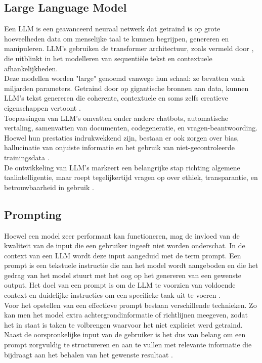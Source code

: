 \subsection{Large Language Model}
    
Een LLM is een geavanceerd neuraal netwerk dat getraind is op grote hoeveelheden data om menselijke taal te kunnen begrijpen, genereren en manipuleren. LLM's gebruiken de transformer architectuur, zoals vermeld door \textcite{vaswani2023attentionneed}, die uitblinkt in het modelleren van sequentiële tekst en contextuele afhankelijkheden.
\\[1em]
Deze modellen worden "large" genoemd vanwege hun schaal: ze bevatten vaak miljarden parameters. Getraind door op gigantische bronnen aan data, kunnen LLM's tekst genereren die coherente, contextuele en soms zelfs creatieve eigenschappen vertoont \autocite{Gupta2025}.
\\[1em]
Toepassingen van LLM's omvatten onder andere chatbots, automatische vertaling, samenvatten van documenten, codegeneratie, en vragen-beantwoording. Hoewel hun prestaties indrukwekkend zijn, bestaan er ook zorgen over bias, hallucinatie van onjuiste informatie en het gebruik van niet-gecontroleerde trainingsdata \autocite{Gupta2025}.
\\[1em]
De ontwikkeling van LLM’s markeert een belangrijke stap richting algemene taalintelligentie, maar roept tegelijkertijd vragen op over ethiek, transparantie, en betrouwbaarheid in gebruik \autocite{Gupta2025}.

\subsection{Prompting} 

Hoewel een model zeer performant kan functioneren, mag de invloed van de kwaliteit van de input die een gebruiker ingeeft niet worden onderschat. In de context van een LLM wordt deze input aangeduid met de term prompt. Een prompt is een tekstuele instructie die aan het model wordt aangeboden en die het gedrag van het model stuurt met het oog op het genereren van een gewenste output. Het doel van een prompt is om de LLM te voorzien van voldoende context en duidelijke instructies om een specifieke taak uit te voeren \autocite{Marvin2024}.
\\[1em]
Voor het opstellen van een effectieve prompt bestaan verschillende technieken. Zo kan men het model extra achtergrondinformatie of richtlijnen meegeven, zodat het in staat is taken te volbrengen waarvoor het niet expliciet werd getraind. Naast de oorspronkelijke input van de gebruiker is het dus van belang om een prompt zorgvuldig te structureren en aan te vullen met relevante informatie die bijdraagt aan het behalen van het gewenste resultaat \autocite{Marvin2024}.

